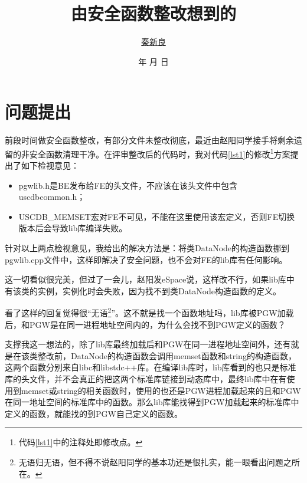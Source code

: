 \documentclass[a4paper, 12pt, titlepage]{article}
\newcommand*{\TitleFont}{\usefont{\encodingdefault}{\rmdefault}{b}{n}\fontsize{32}{40}\selectfont\CJKfamily{title}\color{seco}}%
\renewcommand{\today}{\color{seco}\number\year 年 \number\month 月 \number\day 日}
\begin{document}
\setlength{\parindent}{2em}

\title{\TitleFont 由安全函数整改想到的\vspace{8cm}}
\author{\href{mailto:q00148943@gmail.com}{\LARGE{秦新良}}}
\date{\vspace{0.5cm}\today}

\maketitle

\tableofcontents
\newpage


\section{问题提出}
前段时间做安全函数整改，有部分文件未整改彻底，最近由赵阳同学接手将剩余遗留的非安全函数清理干净。在评审整改后的代码时，我对代码\ref{lst1}的修改\footnote{代码\ref{lst1}中的注释处即修改点。}方案提出了如下检视意见：
\begin{itemize}
\item pgwlib.h是BE发布给FE的头文件，不应该在该头文件中包含uscdbcommon.h；
\item USCDB\_MEMSET宏对FE不可见，不能在这里使用该宏定义，否则FE切换版本后会导致lib库编译失败。
\end{itemize}
针对以上两点检视意见，我给出的解决方法是：将类DataNode的构造函数挪到pgwlib.cpp文件中，这样即解决了安全问题，也不会对FE的lib库有任何影响。
\begin{spacing}{1.0}
  
\end{spacing}
这一切看似很完美，但过了一会儿，赵阳发eSpace说，这样改不行，如果lib库中有该类的实例，实例化时会失败，因为找不到类DataNode构造函数的定义。

看了这样的回复觉得很“无语\footnote{无语归无语，但不得不说赵阳同学的基本功还是很扎实，能一眼看出问题之所在。}”。这不就是找一个函数地址吗，lib库被PGW加载后，和PGW是在同一进程地址空间内的，为什么会找不到PGW定义的函数？

支撑我这一想法的，除了lib库最终加载后和PGW在同一进程地址空间外，还有就是在该类整改前，DataNode的构造函数会调用memset函数和string的构造函数，这两个函数分别来自libc和libstdc++库。在编译lib库时，lib库看到的也只是标准库的头文件，并不会真正的把这两个标准库链接到动态库中，最终lib库中在有使用到memset或string的相关函数时，使用的也还是PGW进程加载起来的且和PGW在同一地址空间的标准库中的函数。那么lib库能找得到PGW加载起来的标准库中定义的函数，就能找的到PGW自己定义的函数。
\end{document}
